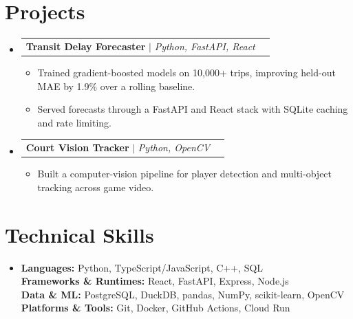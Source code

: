 \documentclass[letterpaper,10pt]{article}
\makeatletter
\newcommand{\resumeItem}[1]{
  \item\small{
    {#1 \vspace{-1pt}}
  }
}
\newcommand{\resumeProjectHeading}[2]{
  \item
    \begin{tabular*}{0.97\textwidth}{l@{\extracolsep{\fill}}r}
      \small#1 & #2 \\
    \end{tabular*}\vspace{-5pt}
}
\newcommand{\resumeSubHeadingListStart}{
  \begin{itemize}[leftmargin=0.15in, label={}]
}
\newcommand{\resumeSubHeadingListEnd}{
  \end{itemize}
}
\newcommand{\resumeItemListStart}{
  \begin{itemize}
}
\newcommand{\resumeItemListEnd}{
  \end{itemize}\vspace{-2pt}
}
\makeatother
\begin{document}
\section{Projects}
  \resumeSubHeadingListStart
    \resumeProjectHeading
      {\textbf{Transit Delay Forecaster}
      $|$ \emph{Python, FastAPI, React}}{}
      \resumeItemListStart
        \resumeItem{
          Trained gradient-boosted models on 10,000+ trips, improving held-out MAE by 1.9\% over a rolling baseline.
        }
        \resumeItem{
          Served forecasts through a FastAPI and React stack with SQLite caching and rate limiting.
        }
      \resumeItemListEnd
    \resumeProjectHeading
      {\textbf{Court Vision Tracker}
      $|$ \emph{Python, OpenCV}}{}
      \resumeItemListStart
        \resumeItem{
          Built a computer-vision pipeline for player detection and multi-object tracking across game video.
        }
      \resumeItemListEnd
  \resumeSubHeadingListEnd

\section{Technical Skills}
  \begin{itemize}[leftmargin=0.15in, label={}]
    \small
    \item{
      \textbf{Languages:}
      Python, TypeScript/JavaScript, C++, SQL \\[3pt]
      \textbf{Frameworks \& Runtimes:}
      React, FastAPI, Express, Node.js \\[3pt]
      \textbf{Data \& ML:}
      PostgreSQL, DuckDB, pandas, NumPy,
      scikit-learn, OpenCV \\[3pt]
      \textbf{Platforms \& Tools:}
      Git, Docker, GitHub Actions, Cloud Run
    }
  \end{itemize}
\end{document}
